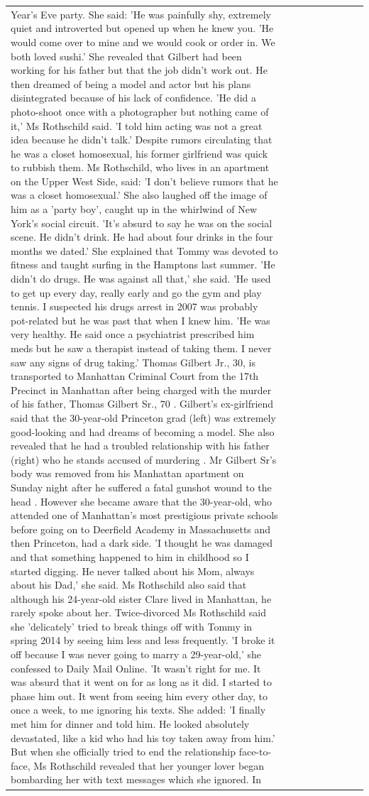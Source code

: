 \begin{table}[H]
\begin{tabular}{lllrlllll}
Year’s Eve party. She said: 'He was painfully shy, extremely quiet and introverted but opened up when he knew you. 'He would come over to mine and we would cook or order in. We both loved sushi.' She revealed that Gilbert had been working for his father but that the job didn't work out. He then dreamed of being a model and actor but his plans disintegrated because of his lack of confidence. 'He did a photo-shoot once with a photographer but nothing came of it,' Ms Rothschild said. 'I told him acting was not a great idea because he didn’t talk.' Despite rumors circulating that he was a closet homosexual, his former girlfriend was quick to rubbish them. Ms Rothschild, who lives in an apartment on the Upper West Side, said: 'I don’t believe rumors that he was a closet homosexual.' She also laughed off the image of him as a 'party boy', caught up in the whirlwind of New York's social circuit. 'It’s absurd to say he was on the social scene. He didn’t drink. He had about four drinks in the four months we dated.' She explained that Tommy was devoted to fitness and taught surfing in the Hamptons last summer. 'He didn’t do drugs. He was against all that,' she said. 'He used to get up every day, really early and go the gym and play tennis. I suspected his drugs arrest in 2007 was probably pot-related but he was past that when I knew him. 'He was very healthy. He said once a psychiatrist prescribed him meds but he saw a therapist instead of taking them. I never saw any signs of drug taking.' Thomas Gilbert Jr., 30, is transported to Manhattan Criminal Court from the 17th Precinct in Manhattan after being charged with the murder of his father, Thomas Gilbert Sr., 70 . Gilbert's ex-girlfriend said that the 30-year-old Princeton grad (left) was extremely good-looking and had dreams of becoming a model. She also revealed that he had a troubled relationship with his father (right) who he stands accused of murdering . Mr Gilbert Sr's body was removed from his Manhattan apartment on Sunday night after he suffered a fatal gunshot wound to the head . However she became aware that the 30-year-old, who attended one of Manhattan's most prestigious private schools before going on to Deerfield Academy in Massachusetts and then Princeton, had a dark side. 'I thought he was damaged and that something happened to him in childhood so I started digging. He never talked about his Mom, always about his Dad,' she said. Ms Rothschild also said that although his 24-year-old sister Clare lived in Manhattan, he rarely spoke about her. Twice-divorced Ms Rothschild said she 'delicately' tried to break things off with Tommy in spring 2014 by seeing him less and less frequently. 'I broke it off because I was never going to marry a 29-year-old,' she confessed to Daily Mail Online. 'It wasn’t right for me. It was absurd that it went on for as long as it did. I started to phase him out. It went from seeing him every other day, to once a week, to me ignoring his texts. She added: 'I finally met him for dinner and told him. He looked absolutely devastated, like a kid who had his toy taken away from him.' But when she officially tried to end the relationship face-to-face, Ms Rothschild revealed that her younger lover began bombarding her with text messages which she ignored. In 
\end{tabular}
\end{table}
